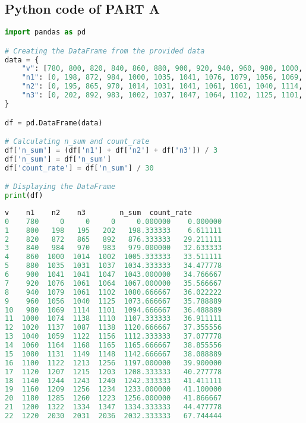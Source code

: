 \documentclass[a4paper,11pt]{article}
\begin{document}
\subsection*{Python code of PART A}
\begin{lstlisting}[language=Python]
import pandas as pd

# Creating the DataFrame from the provided data
data = {
    "v": [780, 800, 820, 840, 860, 880, 900, 920, 940, 960, 980, 1000, 1020, 1040, 1060, 1080, 1100, 1120, 1140, 1160, 1180, 1200, 1220],
    "n1": [0, 198, 872, 984, 1000, 1035, 1041, 1076, 1079, 1056, 1069, 1074, 1137, 1059, 1164, 1131, 1122, 1207, 1244, 1209, 1285, 1322, 2030],
    "n2": [0, 195, 865, 970, 1014, 1031, 1041, 1061, 1061, 1040, 1114, 1138, 1087, 1122, 1168, 1149, 1213, 1215, 1243, 1256, 1260, 1334, 2031],
    "n3": [0, 202, 892, 983, 1002, 1037, 1047, 1064, 1102, 1125, 1101, 1110, 1138, 1156, 1165, 1148, 1256, 1203, 1240, 1234, 1223, 1347, 2036]
}

df = pd.DataFrame(data)

# Calculating n_sum and count_rate
df['n_sum'] = (df['n1'] + df['n2'] + df['n3']) / 3
df['n_sum'] = df['n_sum']
df['count_rate'] = df['n_sum'] / 30

# Displaying the DataFrame
print(df)
\end{lstlisting}
\begin{lstlisting}[language=Python]
       v    n1    n2    n3        n_sum  count_rate
0    780     0     0     0     0.000000    0.000000
1    800   198   195   202   198.333333    6.611111
2    820   872   865   892   876.333333   29.211111
3    840   984   970   983   979.000000   32.633333
4    860  1000  1014  1002  1005.333333   33.511111
5    880  1035  1031  1037  1034.333333   34.477778
6    900  1041  1041  1047  1043.000000   34.766667
7    920  1076  1061  1064  1067.000000   35.566667
8    940  1079  1061  1102  1080.666667   36.022222
9    960  1056  1040  1125  1073.666667   35.788889
10   980  1069  1114  1101  1094.666667   36.488889
11  1000  1074  1138  1110  1107.333333   36.911111
12  1020  1137  1087  1138  1120.666667   37.355556
13  1040  1059  1122  1156  1112.333333   37.077778
14  1060  1164  1168  1165  1165.666667   38.855556
15  1080  1131  1149  1148  1142.666667   38.088889
16  1100  1122  1213  1256  1197.000000   39.900000
17  1120  1207  1215  1203  1208.333333   40.277778
18  1140  1244  1243  1240  1242.333333   41.411111
19  1160  1209  1256  1234  1233.000000   41.100000
20  1180  1285  1260  1223  1256.000000   41.866667
21  1200  1322  1334  1347  1334.333333   44.477778
22  1220  2030  2031  2036  2032.333333   67.744444
\end{lstlisting}
\end{document}
